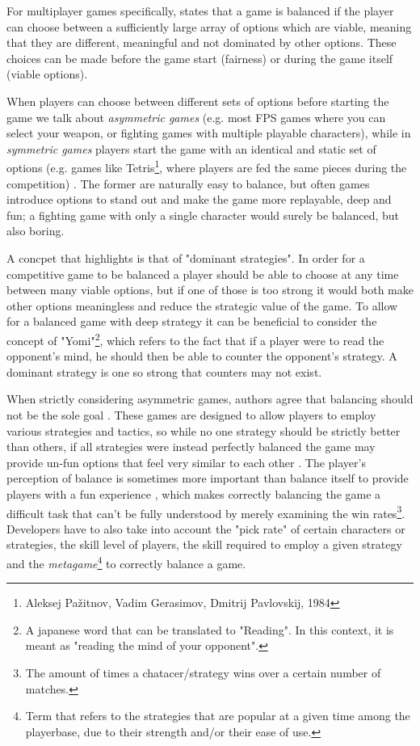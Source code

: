 \documentclass{Configuration_Files/PoliMi3i_thesis}
\begin{document}
For multiplayer games specifically, \citeauthor{sirlin_balancing_2014} states that a game is balanced if the player can choose between a sufficiently large array of options which are viable, meaning that they are different, meaningful and not dominated by other options. These choices can be made before the game start (fairness) or during the game itself (viable options). \cite{sirlin_balancing_2014}

When players can choose between different sets of options before starting the game we talk about \textit{asymmetric games} (e.g. most FPS games where you can select your weapon, or fighting games with multiple playable characters), while in \textit{symmetric games} players start the game with an identical and static set of options (e.g. games like Tetris\footnote{Aleksej Pažitnov, Vadim Gerasimov, Dmitrij Pavlovskij, 1984}, where players are fed the same pieces during the competition) \cite{sirlin_balancing_2014}. The former are naturally easy to balance, but often games introduce options to stand out and make the game more replayable, deep and fun; a fighting game with only a single character would surely be balanced, but also boring. 

A concpet that \citeauthor{sirlin_balancing_2014} highlights is that of "dominant strategies". In order for a competitive game to be balanced a player should be able to choose at any time between many viable options, but if one of those is too strong it would both make other options meaningless and reduce the strategic value of the game. To allow for a balanced game with deep strategy it can be beneficial to consider the concept of "Yomi"\footnote{A japanese word that can be translated to "Reading". In this context, it is meant as "reading the mind of your opponent".}, which refers to the fact that if a player were to read the opponent's mind, he should then be able to counter the opponent's strategy. A dominant strategy is one so strong that counters may not exist. \cite{sirlin_balancing_2014}

When strictly considering asymmetric games, authors agree that balancing should not be the sole goal \cite{sirlin_balancing_2014} \cite{portwnow_perfect_2012} \cite{brown_how_2019}. These games are designed to allow players to employ various strategies and tactics, so while no one strategy should be strictly better than others, if all strategies were instead perfectly balanced the game may provide un-fun options that feel very similar to each other \cite{sakurai_amplify_2024}. The player's perception of balance is sometimes more important than balance itself to provide players with a fun experience \cite{brown_how_2019}, which makes correctly balancing the game a difficult task that can't be fully understood by merely examining the win rates\footnote{The amount of times a chatacer/strategy wins over a certain number of matches.}. Developers have to also take into account the "pick rate" of certain characters or strategies, the skill level of players, the skill required to employ a given strategy and the \textit{metagame}\footnote{Term that refers to the strategies that are popular at a given time among the playerbase, due to their strength and/or their ease of use.} to correctly balance a game. \cite{brown_how_2019} 
\end{document}
